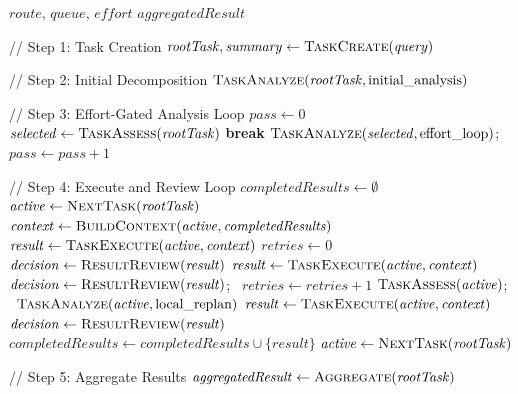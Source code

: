 \documentclass{article}
\begin{document}
\begin{algorithm}[t]
\caption{TINYCUA Task Processing}
\label{alg:task-processing}
\begin{algorithmic}[1]
\Require $\mathit{route}$, $\mathit{queue}$, $\mathit{effort}$
\Ensure $\mathit{aggregatedResult}$

// Step 1: Task Creation
    \State $\mathit{rootTask}, \mathit{summary} \gets \textsc{TaskCreate}(\mathit{query})$
\EndIf

// Step 2: Initial Decomposition
\State $\textsc{TaskAnalyze}(\mathit{rootTask}, \text{initial\_analysis})$

// Step 3: Effort-Gated Analysis Loop
\State $\mathit{pass} \gets 0$
    \State $\mathit{selected} \gets \textsc{TaskAssess}(\mathit{rootTask})$
        \State \textbf{break}
    \EndIf
    \State $\textsc{TaskAnalyze}(\mathit{selected}, \text{effort\_loop})$; \ $\mathit{pass} \gets \mathit{pass} + 1$
\EndWhile

// Step 4: Execute and Review Loop
\State $\mathit{completedResults} \gets \emptyset$
\State $\mathit{active} \gets \textsc{NextTask}(\mathit{rootTask})$
    \State $\mathit{context} \gets \textsc{BuildContext}(\mathit{active}, \mathit{completedResults})$
    \State $\mathit{result} \gets \textsc{TaskExecute}(\mathit{active}, \mathit{context})$
    \State $\mathit{retries} \gets 0$
    \State $\mathit{decision} \gets \textsc{ResultReview}(\mathit{result})$
        \State $\mathit{result} \gets \textsc{TaskExecute}(\mathit{active}, \mathit{context})$
        \State $\mathit{decision} \gets \textsc{ResultReview}(\mathit{result})$; \ $\mathit{retries} \gets \mathit{retries} + 1$
    \EndWhile
        \State $\textsc{TaskAssess}(\mathit{active})$; \ $\textsc{TaskAnalyze}(\mathit{active}, \text{local\_replan})$
        \State $\mathit{result} \gets \textsc{TaskExecute}(\mathit{active}, \mathit{context})$
        \State $\mathit{decision} \gets \textsc{ResultReview}(\mathit{result})$
    \EndIf
    \State $\mathit{completedResults} \gets \mathit{completedResults} \cup \{\mathit{result}\}$
    \State $\mathit{active} \gets \textsc{NextTask}(\mathit{rootTask})$
\EndWhile

// Step 5: Aggregate Results
\State $\mathit{aggregatedResult} \gets \textsc{Aggregate}(\mathit{rootTask})$

\end{algorithmic}
\end{algorithm}
\end{document}
